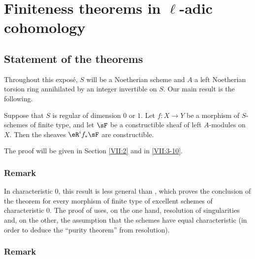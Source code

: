 

\chapter{Finiteness theorems in \texorpdfstring{$\ell$}{l}-adic cohomology}\label{VII}











\section{Statement of the theorems}\label{VII:1}

Throughout this exposé, $S$ will be a Noetherian scheme and $A$ a left
Noetherian torsion ring annihilated by an integer invertible on $S$. Our main
result is the following.






\begin{theorem_}\label{VII:1-1}
Suppose that $S$ is regular of dimension $0$ or $1$. Let $f:X\to Y$ be a
morphism of $S$-schemes of finite type, and let $\sF$ be a constructible sheaf
of left $A$-modules on $X$. Then the sheaves $\eR^i f_\ast \sF$ are
constructible.
\end{theorem_}

The proof will be given in Section \ref{VII:2} and in \ref{VII:3-10}.






\subsection{Remark}\label{VII:1-2}

In characteristic $0$, this result is less general than
\cite[XIX paragraphe 5]{sga4}, which proves the conclusion of the theorem for
every morphism of finite type of excellent schemes of characteristic $0$.
The proof of \cite[XIX]{sga4} uses, on the one hand, resolution of
singularities and, on the other, the assumption that the schemes have equal
characteristic (in order to deduce the ``purity theorem'' from resolution).






\subsection{Remark}\label{VII:1-3}


